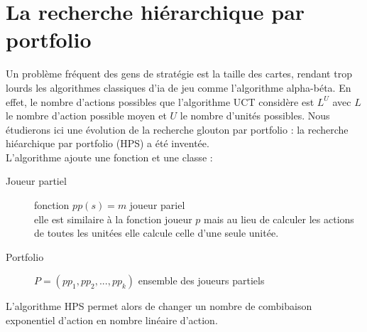 \documentclass[a4paper, 11pt]{article}
\theoremstyle{definition}
\begin{document}
\section{La recherche hiérarchique par portfolio}
Un problème fréquent des gens de stratégie est la taille des cartes, rendant trop
lourds les algorithmes classiques d'ia de jeu comme l'algorithme alpha-béta. 
En effet, le nombre d'actions possibles que l'algorithme UCT considère est $L^U$
avec $L$ le nombre d'action possible moyen et $U$ le nombre d'unités possibles.
Nous étudierons ici une évolution de la recherche glouton par portfolio : la
recherche hiéarchique par portfolio (HPS) a été inventée.\\
L'algorithme ajoute une fonction et une classe :
\begin{description}
    \item[Joueur partiel] fonction $pp(s) = m$ joueur pariel \\
    elle est similaire à la fonction joueur $p$ mais au lieu de calculer les actions
    de toutes les unitées elle calcule celle d'une seule unitée.
    \item[Portfolio] $P = (pp_1, pp_2, ..., pp_k)$ ensemble des joueurs partiels
\end{description}
    L'algorithme HPS permet alors de changer un nombre de combibaison exponentiel
d'action en nombre linéaire d'action.
\end{document}
